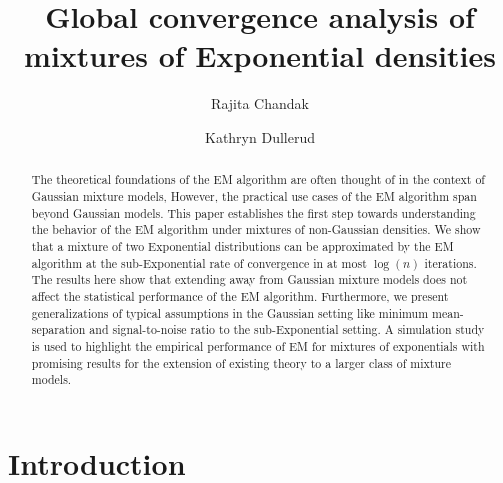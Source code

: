 \documentclass[runningheads]{llncs}
\begin{document}
%
\title{Global convergence analysis of mixtures of Exponential densities}
%
%
\author{Rajita Chandak \and
Kathryn Dullerud}
%
%
%
\maketitle              %
%
\begin{abstract}
  The theoretical foundations of the EM algorithm are often thought of
  in the context of Gaussian mixture models, However, the practical use cases of
  the EM algorithm span beyond Gaussian models. This paper establishes the first
  step towards understanding the behavior of the EM algorithm under mixtures of
  non-Gaussian densities. We show that a mixture of two Exponential
  distributions can be approximated by the EM algorithm at the sub-Exponential
  rate of convergence in at most $\log (n)$ iterations. The results here show
  that extending away from Gaussian mixture models does not affect the statistical
  performance of the EM algorithm. Furthermore, we present generalizations of
  typical assumptions in the Gaussian setting like minimum mean-separation and
  signal-to-noise ratio to the sub-Exponential setting.
  A simulation study is used to highlight the empirical performance of EM for
  mixtures of exponentials with promising results for the extension of
  existing theory to a larger class of mixture models.
\end{abstract}


\section{Introduction}\label{intro}
\end{document}
